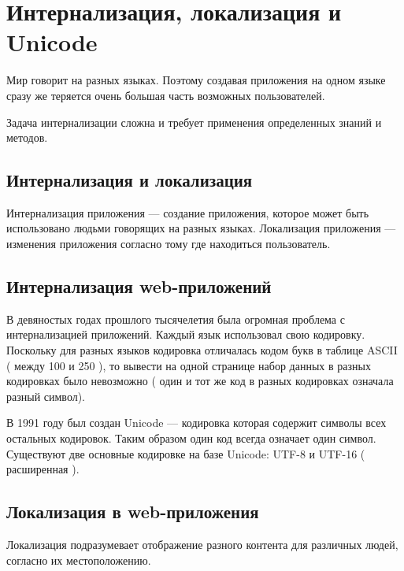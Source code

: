\chapter{ Интернализация, локализация и Unicode } \label{chapt3}


Мир говорит на разных языках. Поэтому создавая приложения на одном языке сразу же теряется очень большая часть возможных пользователей.

Задача интернализации сложна и требует применения определенных знаний и методов.

\section{ Интернализация и локализация} \label{sect3_1}

 
 Интернализация приложения --- создание приложения, которое может быть использовано людьми говорящих на разных языках. Локализация приложения --- изменения приложения согласно тому где находиться пользователь.
 
 \section{ Интернализация web-приложений} \label{sect3_2}
 
 В девяностых годах прошлого тысячелетия была огромная проблема с интернализацией приложений. Каждый язык использовал свою кодировку. Поскольку для разных языков кодировка отличалась кодом букв в таблице ASCII ( между 100 и 250 ), то вывести на одной странице набор данных в разных кодировках было невозможно ( один и тот же код в разных кодировках означала разный символ).
 
 
 В 1991 году был создан Unicode --- кодировка которая содержит символы всех остальных кодировок. Таким образом один код всегда означает один символ. Существуют две основные кодировке на базе Unicode: UTF-8 и UTF-16 ( расширенная ).
 
\section{Локализация в web-приложения} \label{sect3_3}

Локализация подразумевает отображение разного контента для различных людей, согласно их местоположению.


